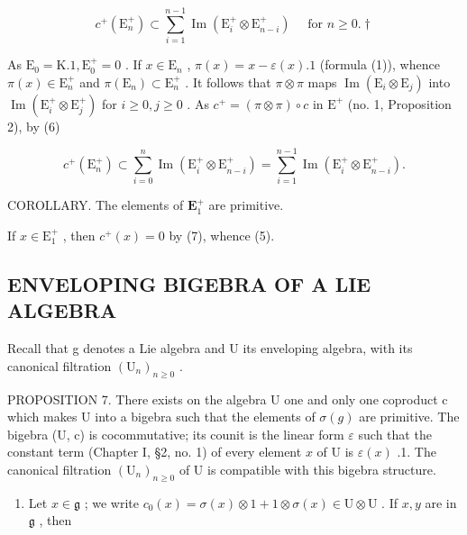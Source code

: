 \[
c ^ {+} (\mathrm{E} _ {n} ^ {+}) \subset \sum_ {i = 1} ^ {n - 1} \operatorname{Im} (\mathrm{E} _ {i} ^ {+} \otimes \mathrm{E} _ {n - i} ^ {+}) \quad \text { for } n \geqslant 0. \dagger\tag{7}
\]

As \(\mathrm{E}_0 = \mathrm{K}.1, \mathrm{E}_0^+ = 0\) . If \(x \in \mathrm{E}_n\) , \(\pi(x) = x - \varepsilon(x).1\) (formula (1)), whence \(\pi(x) \in \mathrm{E}_n^+\) and \(\pi(\mathrm{E}_n) \subset \mathrm{E}_n^+\) . It follows that \(\pi \otimes \pi\) maps \(\operatorname{Im}(\mathrm{E}_i \otimes \mathrm{E}_j)\) into \(\operatorname{Im}(\mathrm{E}_i^+ \otimes \mathrm{E}_j^+)\) for \(i \geqslant 0, j \geqslant 0\) . As \(c^+ = (\pi \otimes \pi) \circ c\) in \(\mathrm{E}^+\) (no. 1, Proposition 2), by (6)

\[
c ^ {+} \left(\mathrm{E} _ {n} ^ {+}\right) \subset \sum_ {i = 0} ^ {n} \operatorname{Im} \left(\mathrm{E} _ {i} ^ {+} \otimes \mathrm{E} _ {n - i} ^ {+}\right) = \sum_ {i = 1} ^ {n - 1} \operatorname{Im} \left(\mathrm{E} _ {i} ^ {+} \otimes \mathrm{E} _ {n - i} ^ {+}\right).
\]

COROLLARY. The elements of \(\mathbf{E}_1^+\) are primitive.

If \(x \in \mathrm{E}_{1}^{+}\) , then \(c^{+}(x) = 0\) by (7), whence (5).

\subsection{ENVELOPING BIGEBRA OF A LIE ALGEBRA}

Recall that g denotes a Lie algebra and U its enveloping algebra, with its canonical filtration \((\mathrm{U}_{n})_{n\geqslant0}\) .

PROPOSITION 7. There exists on the algebra U one and only one coproduct c which makes U into a bigebra such that the elements of \(\sigma(g)\) are primitive. The bigebra (U, c) is cocommutative; its counit is the linear form \(\varepsilon\) such that the constant term (Chapter I, §2, no. 1) of every element \(x\) of U is \(\varepsilon(x)\) .1. The canonical filtration \((\mathrm{U}_n)_{n\geqslant 0}\) of U is compatible with this bigebra structure.

\begin{enumerate}
\def\labelenumi{(\alph{enumi})}
\tightlist
\item
  Let \(x \in \mathfrak{g}\) ; we write \(c_0(x) = \sigma(x) \otimes 1 + 1 \otimes \sigma(x) \in \mathrm{U} \otimes \mathrm{U}\) . If \(x, y\) are in \(\mathfrak{g}\) , then
\end{enumerate}

